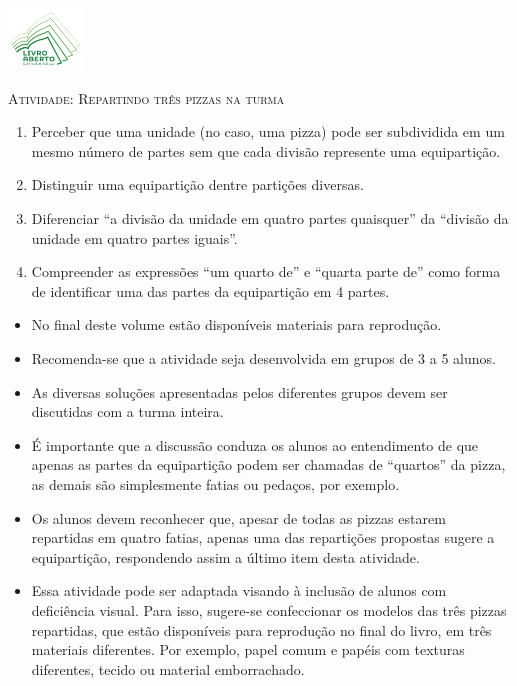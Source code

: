 \documentclass[10 pt,usenames,dvipsnames, oneside]{article}
\begin{document}
\begin{center}
  \begin{minipage}[l]{3cm}
\includegraphics[width=2cm]{../../../Figuras/logo}       
\end{minipage}\hfill
\begin{minipage}[r]{.8\textwidth}
 {\Large \scshape Atividade: Repartindo três pizzas na turma}  
\end{minipage}
\end{center}
\vspace{.2cm}

\ifdefined\prof
\begin{goals}
\begin{enumerate}

\item       Perceber que uma unidade (no caso, uma pizza) pode ser subdividida em um mesmo número de partes sem que cada divisão represente uma equipartição.
\item       Distinguir uma equipartição dentre partições diversas.
\item       Diferenciar       ``a divisão da unidade em quatro partes quaisquer'' da       ``divisão da unidade em quatro partes iguais''.
\item       Compreender as expressões ``um quarto de'' e ``quarta parte de'' como forma de identificar uma das partes da equipartição em 4 partes.
\end{enumerate}
\tcblower

  \begin{itemize} %
    \item No final deste volume estão disponíveis materiais para reprodução.
    \item Recomenda-se que a atividade seja desenvolvida em grupos de 3 a 5 alunos.
    \item As diversas soluções apresentadas pelos diferentes grupos devem ser discutidas com a turma inteira.
    \item É importante que a discussão conduza os alunos ao entendimento de que apenas as partes da equipartição podem ser chamadas de ``quartos'' da pizza, as demais são simplesmente fatias ou pedaços, por exemplo.
    \item Os alunos devem reconhecer que, apesar de todas as pizzas estarem repartidas em quatro fatias, apenas uma das repartições propostas sugere a equipartição, respondendo assim a último item desta atividade.
    \item       Essa atividade pode ser adaptada visando à inclusão de alunos com deficiência visual. Para isso, sugere-se confeccionar os modelos das três pizzas repartidas, que estão disponíveis para reprodução no final do livro, em três materiais diferentes. Por exemplo, papel comum e papéis com texturas diferentes, tecido ou material emborrachado.
\end{itemize} %

\end{goals}
\end{document}
